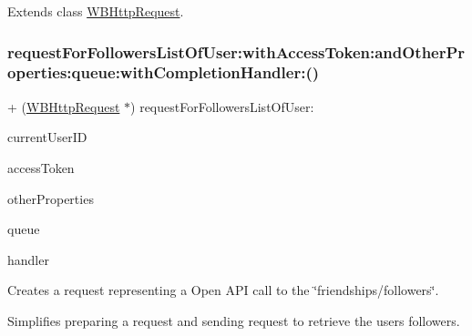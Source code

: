 Extends class \mbox{\hyperlink{interface_w_b_http_request_a857eebccc3b26b8d7c5bbc38a3ae2627}{W\+B\+Http\+Request}}.

\mbox{\label{category_w_b_http_request_07_weibo_user_08_a0437dae63fa8fe40c7c5b323b45e0094}} 
\subsubsection{\texorpdfstring{request\+For\+Followers\+List\+Of\+User\+:with\+Access\+Token\+:and\+Other\+Properties\+:queue\+:with\+Completion\+Handler\+:()}{requestForFollowersListOfUser:withAccessToken:andOtherProperties:queue:withCompletionHandler:()}\hspace{0.1cm}{\footnotesize\ttfamily [1/3]}}
{\footnotesize\ttfamily + (\mbox{\hyperlink{interface_w_b_http_request}{W\+B\+Http\+Request}} $\ast$) request\+For\+Followers\+List\+Of\+User\+: \begin{DoxyParamCaption}\item[{(N\+S\+String $\ast$)}]{current\+User\+ID }\item[{withAccessToken:(N\+S\+String $\ast$)}]{access\+Token }\item[{andOtherProperties:(N\+S\+Dictionary $\ast$)}]{other\+Properties }\item[{queue:(N\+S\+Operation\+Queue $\ast$)}]{queue }\item[{withCompletionHandler:(W\+B\+Request\+Handler)}]{handler }\end{DoxyParamCaption}}

Creates a request representing a Open A\+PI call to the \char`\"{}friendships/followers\char`\"{}.

Simplifies preparing a request and sending request to retrieve the user\textquotesingle{}s followers.

